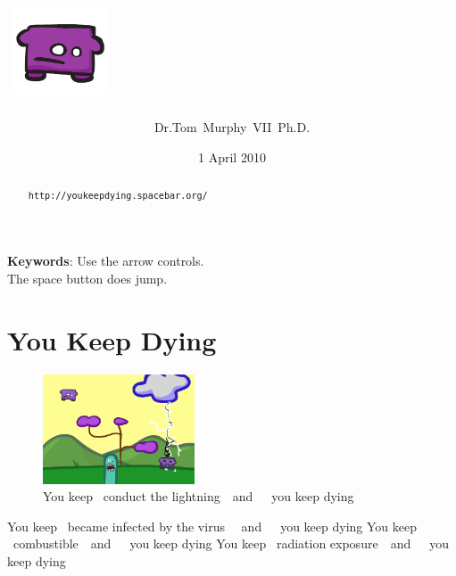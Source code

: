 \documentclass[twocolumn]{article}
\newcommand\ykd[1]{You keep ~{#1}~~and~~~you keep dying\qquad}
\begin{document}
 

\title{\includegraphics[width=4em]{you}\qquad{}~~~~~~~~~~~~~~~~~~~~~~~~}
\author{Dr.Tom~Murphy~VII~Ph.D.}
\date{1 April 2010}

\maketitle

\begin{abstract}
{\tt http://youkeepdying.spacebar.org/ }
\end{abstract}


\vspace{1em}
{\noindent \small {\bf Keywords}:
  Use the arrow controls.\\
 The space button does jump.
}

\section*{You Keep Dying}

\begin{figure}[b!]
\includegraphics[width=0.40\textwidth]{lightning}
\caption{\tiny \ykd{conduct the lightning}} \label{fig:lightning}
\end{figure}

\ykd{became infected by the virus \newline}
\ykd{\newline combustible}
\ykd{radiation exposure}
\end{document}
